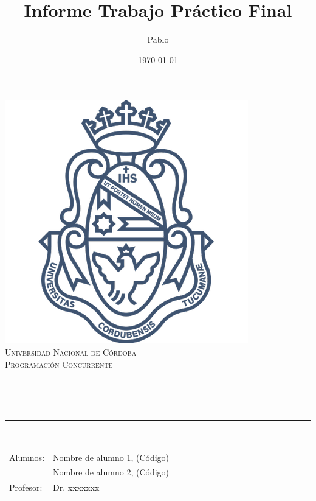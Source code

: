 \documentclass[12pt]{article}
\title{Informe Trabajo Práctico Final}					%
\author{Pablo}					%
\date{\today}						%
\makeatletter
\let\thetitle\@title
\let\theauthor\@author
\makeatother
\begin{document}

\begin{titlepage}
	\centering
    \vspace*{0.0 cm}
    \includegraphics[scale = 0.7]{Universidad_Nacional_de_Cordoba.png}\\[1.0 cm]	%
    \textsc{\LARGE Universidad Nacional de Córdoba}\\[1.5 cm]	%
	\textsc{\Large Programación Concurrente}\\[0.5 cm] %
	\rule{\linewidth}{0.2 mm} \\[0.4 cm]
	{ \huge \bfseries \thetitle}\\
	\rule{\linewidth}{0.2 mm} \\[1.5 cm]
	
\centering
\begin{tabular}{ll}
Alumnos:			&	Nombre de alumno 1, (Código)\\
					&	Nombre de alumno 2, (Código)\\
Profesor:			&	Dr. xxxxxxx
\end{tabular}	
	
	
	\begin{minipage}{0.4\textwidth}
		\begin{flushleft}
	
		\end{flushleft}
	\end{minipage}
	\begin{minipage}{0.4\textwidth}
		\begin{flushleft} \large
			\theauthor \\
        

\end{flushleft}
\end{minipage}
\end{titlepage}
\end{document}
